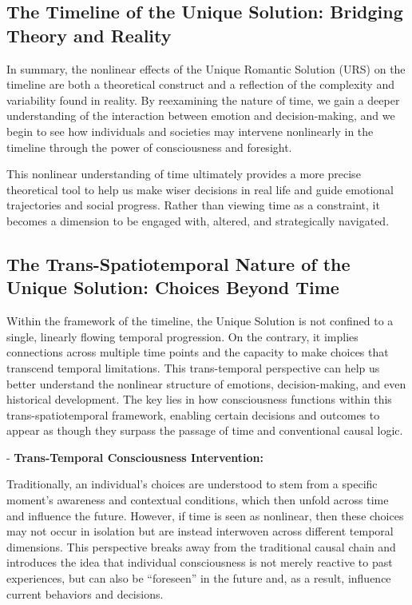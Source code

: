 \documentclass{article}
\begin{document}
\subsection{The Timeline of the Unique Solution: Bridging Theory and Reality}

In summary, the nonlinear effects of the Unique Romantic Solution (URS) on the timeline are both a theoretical construct and a reflection of the complexity and variability found in reality. By reexamining the nature of time, we gain a deeper understanding of the interaction between emotion and decision-making, and we begin to see how individuals and societies may intervene nonlinearly in the timeline through the power of consciousness and foresight.

This nonlinear understanding of time ultimately provides a more precise theoretical tool to help us make wiser decisions in real life and guide emotional trajectories and social progress. Rather than viewing time as a constraint, it becomes a dimension to be engaged with, altered, and strategically navigated.

\subsection{The Trans-Spatiotemporal Nature of the Unique Solution: Choices Beyond Time}

Within the framework of the timeline, the Unique Solution is not confined to a single, linearly flowing temporal progression. On the contrary, it implies connections across multiple time points and the capacity to make choices that transcend temporal limitations. This trans-temporal perspective can help us better understand the nonlinear structure of emotions, decision-making, and even historical development. The key lies in how consciousness functions within this trans-spatiotemporal framework, enabling certain decisions and outcomes to appear as though they surpass the passage of time and conventional causal logic.

- \textbf{Trans-Temporal Consciousness Intervention:}

Traditionally, an individual's choices are understood to stem from a specific moment's awareness and contextual conditions, which then unfold across time and influence the future. However, if time is seen as nonlinear, then these choices may not occur in isolation but are instead interwoven across different temporal dimensions. This perspective breaks away from the traditional causal chain and introduces the idea that individual consciousness is not merely reactive to past experiences, but can also be “foreseen” in the future and, as a result, influence current behaviors and decisions.
\end{document}
